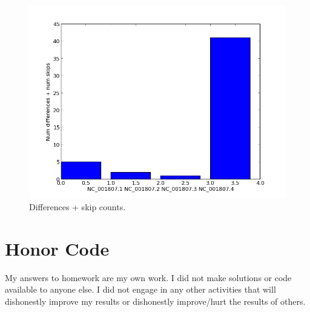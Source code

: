 \documentclass[a4paper,11pt]{article}
\begin{document}
\begin{figure}[h!]
\begin{center}
\includegraphics[scale=0.4]{add.png}
\caption{Differences + skip counts.}
\label{addf}
\end{center}
\end{figure}

\section*{Honor Code}


My answers to homework are my own work. I did not make solutions or code available to anyone else. I did not engage in any other activities that will dishonestly improve my results or dishonestly improve/hurt the results of others.
\end{document}
